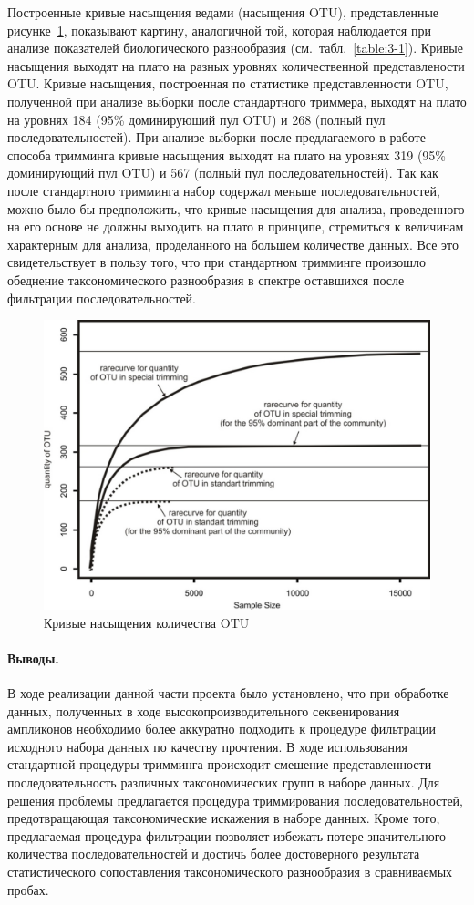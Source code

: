 \documentclass[a4paper,12pt,openany,final]{extreport}
\def\oldcaption{} \let\oldcaption=\caption
\def\caption{\stepcounter{captionsnum}\oldcaption}
\begin{document}
Построенные кривые насыщения ведами (насыщения OTU), представленные
рисунке~\ref{fig:3-1}, показывают картину, аналогичной той, которая наблюдается при
анализе показателей биологического разнообразия (см.~табл.~\ref{table:3-1}). Кривые
насыщения выходят на плато на разных уровнях количественной
представлености OTU. Кривые насыщения, построенная по статистике
представленности OTU, полученной при анализе выборки после стандартного
триммера, выходят на плато на уровнях 184 (95\% доминирующий пул OTU) и
268 (полный пул последовательностей). При анализе выборки после
предлагаемого в работе способа тримминга кривые насыщения выходят на
плато на уровнях 319 (95\% доминирующий пул OTU) и 567 (полный пул
последовательностей). Так как после стандартного тримминга набор
содержал меньше последовательностей, можно было бы предположить, что
кривые насыщения для анализа, проведенного на его основе не должны
выходить на плато в принципе, стремиться к величинам характерным для
анализа, проделанного на большем количестве данных. Все это
свидетельствует в пользу того, что при стандартном тримминге произошло
обеднение таксономического разнообразия в спектре оставшихся после
фильтрации последовательностей.

\begin{figure}\centering
\includegraphics[width=0.6\linewidth]{media/image7.jpeg}

\caption{Кривые насыщения количества OTU}\label{fig:3-1}
\end{figure}

\paragraph{Выводы.} В ходе реализации данной части проекта было
установлено, что при обработке данных, полученных в ходе
высокопроизводительного секвенирования ампликонов необходимо более
аккуратно подходить к процедуре фильтрации исходного набора данных по
качеству прочтения. В ходе использования стандартной процедуры тримминга
происходит смешение представленности последовательность различных
таксономических групп в наборе данных. Для решения проблемы предлагается
процедура триммирования последовательностей, предотвращающая
таксономические искажения в наборе данных. Кроме того, предлагаемая
процедура фильтрации позволяет избежать потере значительного количества
последовательностей и достичь более достоверного результата
статистического сопоставления таксономического разнообразия в
сравниваемых пробах.
\end{document}
